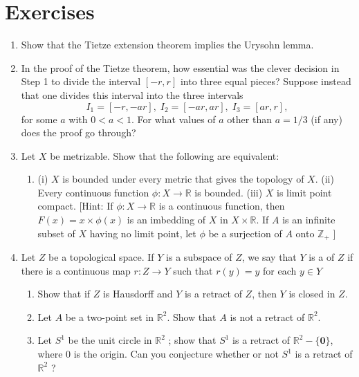 \section*{Exercises}
\begin{enumerate}[itemsep=0.4em, parsep=0pt, topsep=0pt, partopsep=0pt, leftmargin=*, label=\arabic*., ref=\arabic*]
\item Show that the Tietze extension theorem implies the Urysohn lemma.
\item In the proof of the Tietze theorem, how essential was the clever decision in Step 1 to divide the interval \([ {-r,r}]\) into three equal pieces? Suppose instead that one divides this interval into the three intervals \[ I_{1} = [ {-r, - {ar}}] ,\;I_{2} = [ {-{ar},{ar}}] ,\;I_{3} = [ {{ar},r}] , \] for some \(a\) with \(0 < a < 1\). For what values of \(a\) other than \(a = 1/3\) (if any) does the proof go through?
\item Let \(X\) be metrizable. Show that the following are equivalent:
 \begin{enumerate}[itemsep=0.2em, parsep=0pt, topsep=0pt, partopsep=0pt, leftmargin=*, label=(\alph*), align=left]
 \item (i) \(X\) is bounded under every metric that gives the topology of \(X\). (ii) Every continuous function \(\phi : X \rightarrow \mathbb{R}\) is bounded. (iii) \(X\) is limit point compact. [Hint: If \(\phi : X \rightarrow \mathbb{R}\) is a continuous function, then \(F(x) = x \times \phi (x)\) is an imbedding of \(X\) in \(X \times \mathbb{R}\). If \(A\) is an infinite subset of \(X\) having no limit point, let \(\phi\) be a surjection of \(A\) onto \(\mathbb{Z}_{ + }\) ]
 \end{enumerate}
\item Let \(Z\) be a topological space. If \(Y\) is a subspace of \(Z\), we say that \(Y\) is a  of \(Z\) if there is a continuous map \(r : Z \rightarrow Y\) such that \(r( y) = y\) for each \(y \in Y\)
 \begin{enumerate}[itemsep=0.2em, parsep=0pt, topsep=0pt, partopsep=0pt, leftmargin=*, label=(\alph*), align=left]
 \item Show that if \(Z\) is Hausdorff and \(Y\) is a retract of \(Z\), then \(Y\) is closed in \(Z\).
 \item Let \(A\) be a two-point set in \(\mathbb{R}^{2}\). Show that \(A\) is not a retract of \(\mathbb{R}^{2}\).
 \item Let \(S^{1}\) be the unit circle in \(\mathbb{R}^{2}\) ; show that \(S^{1}\) is a retract of \(\mathbb{R}^{2} - \{ \mathbf{0}\}\), where 0 is the origin. Can you conjecture whether or not \(S^{1}\) is a retract of \(\mathbb{R}^{2}\) ?

\end{enumerate}
\end{enumerate}
